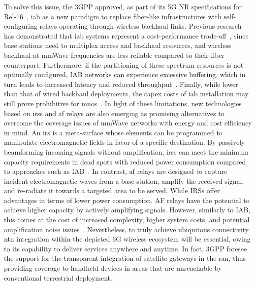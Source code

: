 To solve this issue, the 3GPP approved, as part of its 5G NR specifications for Rel-16~\cite{3gpp_38_874}, \gls{iab} as a new paradigm to replace fiber-like infrastructures with self-configuring relays operating through wireless backhaul links.
Previous research has demonstrated that \gls{iab} systems represent a cost-performance trade-off~\cite{polese2020integrated}, since base stations need to multiplex access and backhaul resources, and wireless backhaul at mmWave frequencies are less reliable compared to their fiber counterpart.
Furthermore, if the partitioning of these spectrum resources is not optimally configured, IAB networks can experience excessive buffering, which in turn leads to increased latency and reduced throughput~\cite{8514996}. Finally, while lower than that of wired backhaul deployments, the \gls{capex} costs of \gls{iab} installation may still prove prohibitive for \glspl{mno}~\cite{chaoub20216g}.
In light of these limitations, new technologies based on \glspl{irs} and \gls{af} relays are also emerging as promising alternatives to overcome the coverage issues of mmWave networks with energy and cost efficiency in mind.
An \gls{irs} is a meta-surface whose elements can be programmed to manipulate electromagnetic fields in favor of a specific destination. By passively beamforming incoming signals without amplification, \glspl{irs} can meet the minimum capacity requirements in dead spots with reduced power consumption compared to approaches such as IAB~\cite{bjornson2019intelligent}. In contrast, \gls{af} relays are designed to capture incident electromagnetic waves from a base station, amplify the received signal, and re-radiate it towards a targeted area to be served.
While IRSs offer advantages in terms of lower power consumption, AF relays have the potential to achieve higher capacity by actively amplifying signals. However, similarly to IAB, this comes at the cost of increased complexity, higher system costs, and potential amplification noise issues~\cite{huang2019reconfigurable}.
Nevertheless, to truly achieve ubiquitous connectivity \gls{ntn} integration within the depicted 6G wireless ecosystem will be essential, owing to its capability to deliver services anywhere and anytime. In fact, 3GPP foresee the support for the transparent integration of satellite gateways in the \gls{ran}, thus providing coverage to handheld devices in areas that are unreachable by conventional terrestrial deployment.

